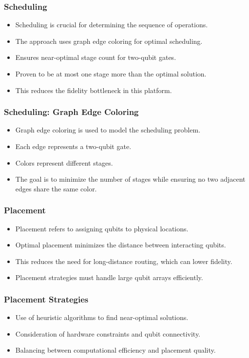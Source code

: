\documentclass[18 pt]{beamer}
\begin{document}
\begin{frame}
    \frametitle{Scheduling}
    \begin{itemize}
        \item Scheduling is crucial for determining the sequence of operations.
        \item The approach uses graph edge coloring for optimal scheduling.
        \item Ensures near-optimal stage count for two-qubit gates.
        \item Proven to be at most one stage more than the optimal solution.
        \item This reduces the fidelity bottleneck in this platform.
    \end{itemize}
\end{frame}

\begin{frame}
    \frametitle{Scheduling: Graph Edge Coloring}
    \begin{itemize}
        \item Graph edge coloring is used to model the scheduling problem.
        \item Each edge represents a two-qubit gate.
        \item Colors represent different stages.
        \item The goal is to minimize the number of stages while ensuring no two adjacent edges share the same color.
    \end{itemize}
\end{frame}

\begin{frame}
    \frametitle{Placement}
    \begin{itemize}
        \item Placement refers to assigning qubits to physical locations.
        \item Optimal placement minimizes the distance between interacting qubits.
        \item This reduces the need for long-distance routing, which can lower fidelity.
        \item Placement strategies must handle large qubit arrays efficiently.
    \end{itemize}
\end{frame}

\begin{frame}
    \frametitle{Placement Strategies}
    \begin{itemize}
        \item Use of heuristic algorithms to find near-optimal solutions.
        \item Consideration of hardware constraints and qubit connectivity.
        \item Balancing between computational efficiency and placement quality.
    \end{itemize}
\end{frame}
\end{document}
